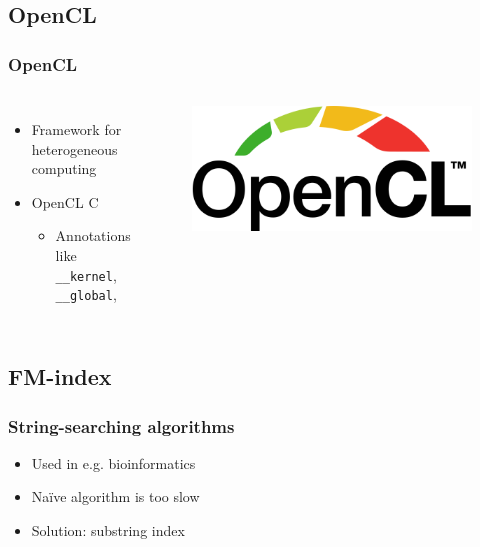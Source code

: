 \documentclass[aspectratio=1610]{uva-inf-presentation}
\begin{document}
\subsection{OpenCL}

\begin{frame}
  \frametitle{OpenCL}
  \begin{columns}[c]
    \begin{itemize}
      \item Framework for heterogeneous computing
      \item OpenCL C
        \begin{itemize}
          \item Annotations like \texttt{\_\_kernel}, \texttt{\_\_global}, \textellipsis
        \end{itemize}
    \end{itemize}
    \begin{figure}
      \begin{mdframed}[backgroundcolor=white]
        \includegraphics[width=1\linewidth]{opencl}
      \end{mdframed}
    \end{figure}
  \end{columns}
\end{frame}

\subsection{FM-index}

\begin{frame}
  \frametitle{String-searching algorithms}
  \begin{itemize}
    \item Used in e.g. bioinformatics
    \item Na\"ive algorithm is too slow
    \item Solution: substring index
  \end{itemize}
\end{frame}
\end{document}
